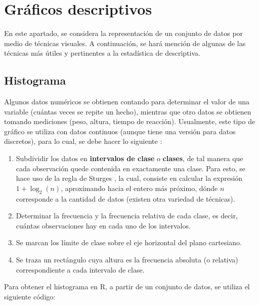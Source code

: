 \documentclass[
]{book}
\providecommand{\tightlist}{%
  \setlength{\itemsep}{0pt}\setlength{\parskip}{0pt}}
\begin{document}
\hypertarget{gruxe1ficos-descriptivos}{%
\section{Gráficos descriptivos}\label{gruxe1ficos-descriptivos}}

En este apartado, se considera la representación de un conjunto de datos por medio de técnicas visuales. A continuación, se hará mención de algunas de las técnicas más útiles y pertinentes a la estadística de descriptiva.

\hypertarget{histograma}{%
\subsection{Histograma}\label{histograma}}

Algunos datos numéricos se obtienen contando para determinar el valor de una variable (cuántas veces se repite un hecho), mientras que otro datos se obtienen tomando mediciones (peso, altura, tiempo de reacción). Usualmente, este tipo de gráfico se utiliza con datos continuos (aunque tiene una versión para datos discretos), para lo cual, se debe hacer lo siguiente \citep[página 12]{Devore}:

\begin{enumerate}
\def\labelenumi{\arabic{enumi}.}
\tightlist
\item
  Subdividir los datos en \textbf{intervalos de clase} o \textbf{clases}, de tal manera que cada observación quede contenida en exactamente una clase. Para esto, se hace uso de la regla de Sturges \citeyearpar{sturges1926choice}, la cual, consiste en calcular la expresión \(1+\log_2(n)\), aproximando hacia el entero más próximo, dónde \(n\) corresponde a la cantidad de datos (existen otra variedad de técnicas).
\item
  Determinar la frecuencia y la frecuencia relativa de cada clase, es decir, cuántas observaciones hay en cada uno de los intervalos.
\item
  Se marcan los límite de clase sobre el eje horizontal del plano cartesiano.
\item
  Se traza un rectángulo cuya altura es la frecuencia absoluta (o relativa) correspondiente a cada intervalo de clase.
\end{enumerate}

Para obtener el histograma en R, a partir de un conjunto de datos, se utiliza el siguiente código:
\end{document}
